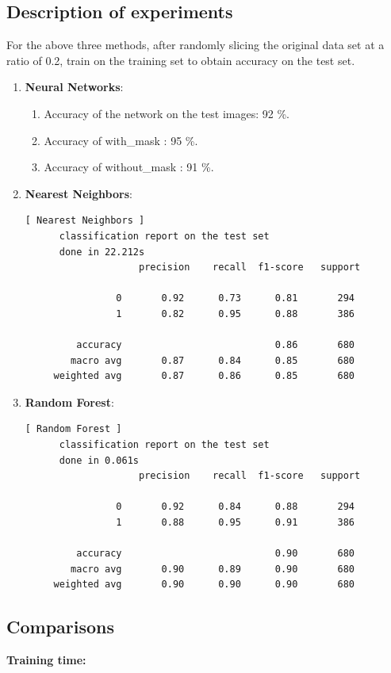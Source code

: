 \documentclass{article}
\begin{document}
  \subsection{Description of experiments}
  For the above three methods, after randomly slicing the original data set at a ratio of 0.2, train on the training set to obtain accuracy on the test set.
  \begin{enumerate}
    \item \textbf{Neural Networks}:
          \begin{enumerate}
            \item Accuracy of the network on the test images: 92 \%.
            \item Accuracy of with\_mask : 95 \%.
            \item Accuracy of without\_mask : 91 \%.
          \end{enumerate}
    \item \textbf{Nearest Neighbors}:\begin{lstlisting}
[ Nearest Neighbors ]
      classification report on the test set
      done in 22.212s
                    precision    recall  f1-score   support

                0       0.92      0.73      0.81       294
                1       0.82      0.95      0.88       386

         accuracy                           0.86       680
        macro avg       0.87      0.84      0.85       680
     weighted avg       0.87      0.86      0.85       680
    \end{lstlisting}
    \item \textbf{Random Forest}:\begin{lstlisting}
[ Random Forest ]
      classification report on the test set
      done in 0.061s
                    precision    recall  f1-score   support

                0       0.92      0.84      0.88       294
                1       0.88      0.95      0.91       386

         accuracy                           0.90       680
        macro avg       0.90      0.89      0.90       680
     weighted avg       0.90      0.90      0.90       680
    \end{lstlisting}

  \end{enumerate}
  \subsection{Comparisons}
  \textbf{Training time:}
\end{document}
